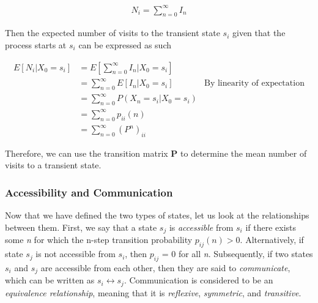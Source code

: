 \documentclass[a4paper, 12pt]{article}
\begin{document}
	\begin{equation*}
	\begin{aligned}
		 N_i = \sum_{n=0}^\infty I_n
	\end{aligned}
	\end{equation*}	
	
	 Then the expected number of visits to the transient state $s_i$ given that the process starts at $s_i$ can be expressed as such
	
	
	\begin{equation*}
	\begin{aligned}
		 E[N_i|X_0 = s_i] &= E\left[\sum_{n=0}^\infty I_n | X_0 = s_i\right] \\
		 				  &= \sum_{n=0}^\infty E\left[I_n | X_0 = s_i\right] &\text{By linearity of expectation}\\
		 				  &= \sum_{n=0}^\infty P(X_n = s_i | X_0 = s_i) \\
		 				  &= \sum_{n=0}^\infty p_{ii}(n) \\
		 				  &= \sum_{n=0}^\infty (P^n)_{ii}
	\end{aligned}
	\end{equation*}	
	
Therefore, we can use the transition matrix \textbf{P} to determine the mean number of visits to a transient state.

	\subsubsection*{Accessibility and Communication}

Now that we have defined the two types of states, let us look at the relationships between them. First, we say that a state $s_j$ is \textit{accessible} from $s_i$ if there exists some \textit{n} for which the n-step transition probability $p_{ij}(n) > 0$. Alternatively, if state $s_j$ is not accessible from $s_i$, then $p_{ij}$ = 0 for all \textit{n}. Subsequently, if two states $s_i$ and $s_j$ are accessible from each other, then they are said to \textit{communicate}, which can be written as $s_i \leftrightarrow s_j$. Communication is considered to be an \textit{equivalence relationship}, meaning that it is \textit{reflexive}, \textit{symmetric}, and \textit{transitive}.
\end{document}
